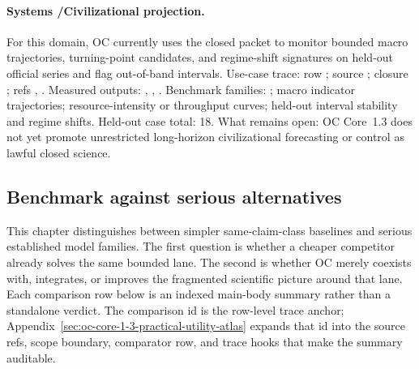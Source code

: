 \paragraph{Systems /\allowbreak Civili\allowbreak{}zational\allowbreak{} projection.}
For this domain, OC currently uses the closed packet to monitor bounded macro trajectories, turning-point candidates, and regime-shift signatures on held-out official series and flag out-of-band intervals.
Use-case trace: row ; \allowbreak source ; \allowbreak closure ; \allowbreak refs , \allowbreak {}.
Measured outputs: , , .
Benchmark families: ; macro indicator trajectories; resource-intensity or throughput curves; held-out interval stability and regime shifts.
Held-out case total: 18.
What remains open: OC Core~1.3 does not yet promote unrestricted long-horizon civilizational forecasting or control as lawful closed science.

\subsection{Benchmark against serious alternatives}
This chapter distinguishes between simpler same-claim-class baselines and serious established model families. The first question is whether a cheaper competitor already solves the same bounded lane. The second is whether OC merely coexists with, integrates, or improves the fragmented scientific picture around that lane.
Each comparison row below is an indexed main-body summary rather than a standalone verdict. The comparison id is the row-level trace anchor; Appendix~\ref{sec:oc-core-1-3-practical-utility-atlas} expands that id into the source refs, scope boundary, comparator row, and trace hooks that make the summary auditable.


